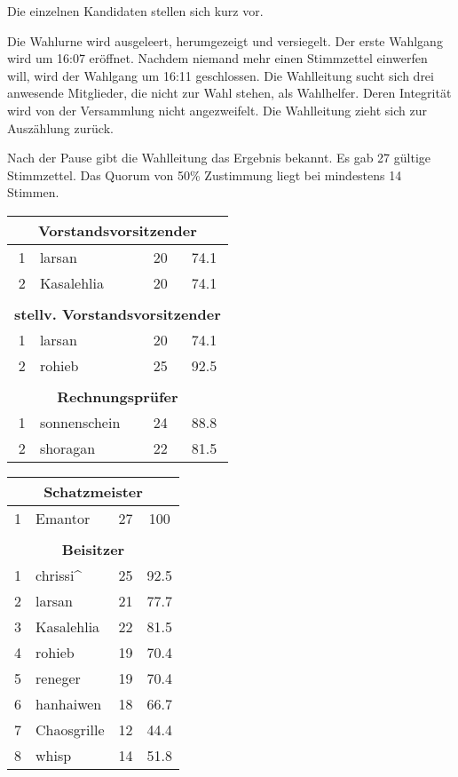 \documentclass{s0minutes}
\begin{document}
Die einzelnen Kandidaten stellen sich kurz vor.

Die Wahlurne wird ausgeleert, herumgezeigt und versiegelt. Der erste Wahlgang
wird um 16:07 eröffnet. Nachdem niemand mehr einen Stimmzettel einwerfen will,
wird der Wahlgang um 16:11 geschlossen. Die Wahlleitung sucht sich drei
anwesende Mitglieder, die nicht zur Wahl stehen, als Wahlhelfer. Deren
Integrität wird von der Versammlung nicht angezweifelt. Die Wahlleitung zieht
sich zur Auszählung zurück.


Nach der Pause gibt die Wahlleitung das Ergebnis bekannt. Es gab 27 gültige
Stimmzettel. Das Quorum von 50\% Zustimmung liegt bei mindestens 14 Stimmen.

\begin{center}
\begin{multicols}{2}
\begin{tabular}{r l l@{ Stimmen (}c@{\%)}}
  \multicolumn{4}{c}{\bfseries Vorstandsvorsitzender} \\
  \midrule
  1 & larsan       & 20 & 74.1 \\
  2 & Kasalehlia   & 20 & 74.1 \\
  \\
  \multicolumn{4}{c}{\bfseries stellv. Vorstandsvorsitzender} \\
  \midrule
  1 & larsan       & 20 & 74.1 \\
  2 & rohieb       & 25 & 92.5 \\
  \\
  \multicolumn{4}{c}{\bfseries Rechnungsprüfer} \\
  \midrule
  1 & sonnenschein & 24 & 88.8 \\
  2 & shoragan     & 22 & 81.5 \\
\end{tabular}
\begin{tabular}{r l l@{ Stimmen (}c@{\%)}}
  \multicolumn{4}{c}{\bfseries Schatzmeister} \\
  \midrule
  1 & Emantor      & 27 & 100 \\
  \\
  \multicolumn{4}{c}{\bfseries Beisitzer} \\
  \midrule
  1 & chrissi\^{}  & 25 & 92.5 \\
  2 & larsan       & 21 & 77.7 \\
  3 & Kasalehlia   & 22 & 81.5 \\
  4 & rohieb       & 19 & 70.4 \\
  5 & reneger      & 19 & 70.4 \\
  6 & hanhaiwen    & 18 & 66.7 \\
  7 & Chaosgrille  & 12 & 44.4 \\
  8 & whisp        & 14 & 51.8 \\
\end{tabular}
\end{multicols}
\end{center}
\end{document}
